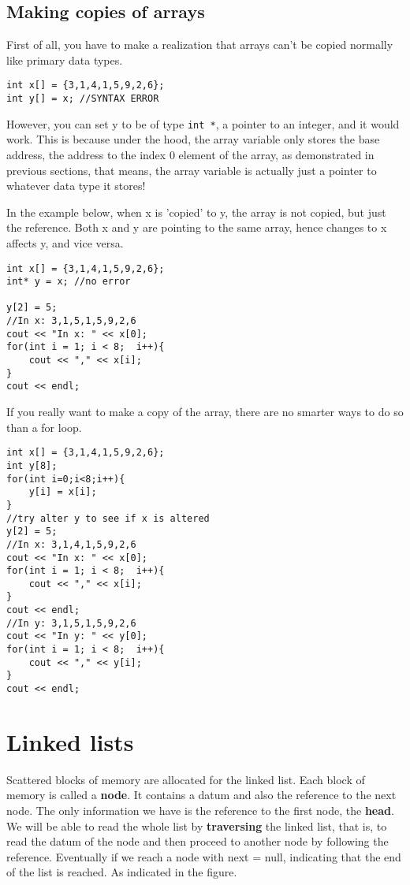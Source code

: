 \subsection{Making copies of arrays}

First of all, you have to make a realization that arrays can't be copied normally like primary data types.

\begin{lstlisting}
int x[] = {3,1,4,1,5,9,2,6};
int y[] = x; //SYNTAX ERROR
\end{lstlisting}

However, you can set y to be of type \texttt{int *}, a pointer to an integer, and it would work. This is because under the hood, the array variable only stores the base address, the address to the index 0 element of the array, as demonstrated in previous sections, that means, the array variable is actually just a pointer to whatever data type it stores! 

In the example below, when x is 'copied' to y, the array is not copied, but just the reference. Both x and y are pointing to the same array, hence changes to x affects y, and vice versa. 

\begin{lstlisting}
int x[] = {3,1,4,1,5,9,2,6};
int* y = x; //no error

y[2] = 5;
//In x: 3,1,5,1,5,9,2,6 
cout << "In x: " << x[0];
for(int i = 1; i < 8;  i++){
    cout << "," << x[i];
}
cout << endl;
\end{lstlisting}

If you really want to make a copy of the array, there are no smarter ways to do so than a for loop.

\begin{lstlisting}
int x[] = {3,1,4,1,5,9,2,6};
int y[8];
for(int i=0;i<8;i++){
    y[i] = x[i];
}
//try alter y to see if x is altered
y[2] = 5;
//In x: 3,1,4,1,5,9,2,6
cout << "In x: " << x[0];
for(int i = 1; i < 8;  i++){
    cout << "," << x[i];
}
cout << endl;
//In y: 3,1,5,1,5,9,2,6
cout << "In y: " << y[0];
for(int i = 1; i < 8;  i++){
    cout << "," << y[i];
}
cout << endl;
\end{lstlisting}

\section{Linked lists}

Scattered blocks of memory are allocated for the linked list. Each block of memory is called a \textbf{node}. It contains a datum and also the reference to the next node. The only information we have is the reference to the first node, the \textbf{head}. We will be able to read the whole list by \textbf{traversing} the linked list, that is, to read the datum of the node and then proceed to another node by following the reference. Eventually if we reach a node with next = null, indicating that the end of the list is reached. As indicated in the figure.

